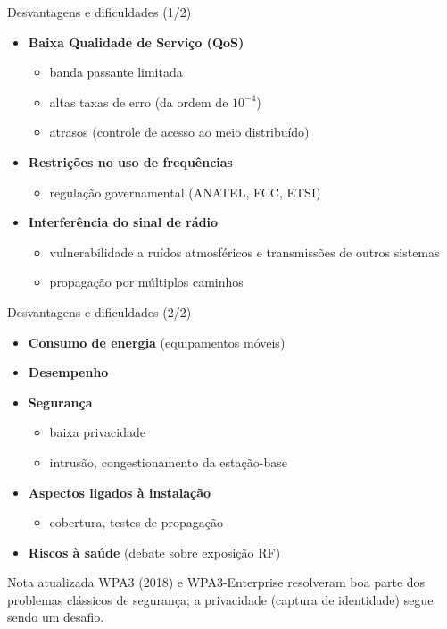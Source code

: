 \documentclass[aspectratio=169,11pt]{beamer}
\begin{document}
\begin{frame}{Desvantagens e dificuldades (1/2)}
  \begin{itemize}
    \item \textbf{Baixa Qualidade de Serviço (QoS)}
      \begin{itemize}
        \item banda passante limitada
        \item altas taxas de erro (da ordem de $10^{-4}$)
        \item atrasos (controle de acesso ao meio distribuído)
      \end{itemize}
    \item \textbf{Restrições no uso de frequências}
      \begin{itemize}
        \item regulação governamental (ANATEL, FCC, ETSI)
      \end{itemize}
    \item \textbf{Interferência do sinal de rádio}
      \begin{itemize}
        \item vulnerabilidade a ruídos atmosféricos e transmissões de outros sistemas
        \item propagação por múltiplos caminhos
      \end{itemize}
  \end{itemize}
\end{frame}

\begin{frame}{Desvantagens e dificuldades (2/2)}
  \begin{itemize}
    \item \textbf{Consumo de energia} (equipamentos móveis)
    \item \textbf{Desempenho}
    \item \textbf{Segurança}
      \begin{itemize}
        \item baixa privacidade
        \item intrusão, congestionamento da estação-base
      \end{itemize}
    \item \textbf{Aspectos ligados à instalação}
      \begin{itemize}
        \item cobertura, testes de propagação
      \end{itemize}
    \item \textbf{Riscos à saúde} (debate sobre exposição RF)
  \end{itemize}
  \begin{exampleblock}{Nota atualizada}
    WPA3 (2018) e WPA3-Enterprise resolveram boa parte dos problemas clássicos de segurança; a privacidade (captura de identidade) segue sendo um desafio.
  \end{exampleblock}
\end{frame}
\end{document}
